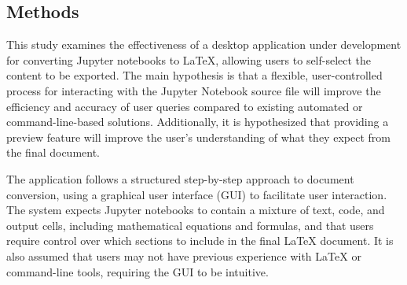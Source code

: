 \documentclass{article}
\begin{document}
\begin{multicols}{2}
\section{Methods}
This study examines the effectiveness of a desktop application under development for converting Jupyter notebooks to LaTeX, allowing users to self-select the content to be exported. The main hypothesis is that a flexible, user-controlled process for interacting with the Jupyter Notebook source file will improve the efficiency and accuracy of user queries compared to existing automated or command-line-based solutions. Additionally, it is hypothesized that providing a preview feature will improve the user's understanding of what they expect from the final document.

The application follows a structured step-by-step approach to document conversion, using a graphical user interface (GUI) to facilitate user interaction. The system expects Jupyter notebooks to contain a mixture of text, code, and output cells, including mathematical equations and formulas, and that users require control over which sections to include in the final LaTeX document. It is also assumed that users may not have previous experience with LaTeX or command-line tools, requiring the GUI to be intuitive.


\end{multicols}
\end{document}
